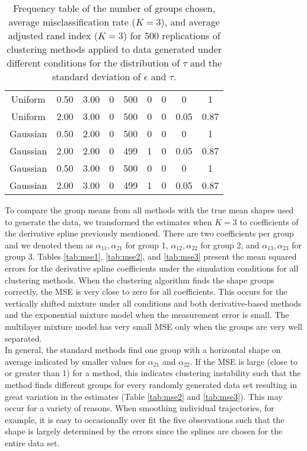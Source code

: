 \begin{table}[ht]
\begin{center}
\begin{tabular}{ccc|cccccc}
  Uniform & 0.50 & 3.00 & 0 & 500 & 0 & 0 & 0 & 1 \\ 
  Uniform & 2.00 & 3.00 & 0 & 500 & 0 & 0 & 0.05 & 0.87 \\ 
  Gaussian & 0.50 & 2.00 & 0 & 500 & 0 & 0 & 0 & 1 \\ 
  Gaussian & 2.00 & 2.00 & 0 & 499 & 1 & 0 & 0.05 & 0.87 \\ 
  Gaussian & 0.50 & 3.00 & 0 & 500 & 0 & 0 & 0 & 1 \\ 
  Gaussian & 2.00 & 3.00 & 0 & 499 & 1 & 0 & 0.05 & 0.87 \\ 
   \hline\end{tabular}
\caption{Frequency table of the number of groups chosen, average misclassification rate ($K=3$), and average adjusted rand index ($K=3$) for 500 replications of clustering methods applied to data generated under different conditions for the distribution of $\tau$ and the standard deviation of $\epsilon$ and $\tau$.}
\label{tab:freq3}
\end{center}
\end{table}

To compare the group means from all methods with the true mean shapes used to generate the data, we transformed the estimates when $K=3$ to coefficients of the derivative spline previously mentioned. There are two coefficients per group and we denoted them as $\alpha_{11},\alpha_{21}$ for group 1, $\alpha_{12},\alpha_{22}$ for group 2, and $\alpha_{13},\alpha_{23}$ for group 3. Tables \ref{tab:mse1}, \ref{tab:mse2}, and \ref{tab:mse3} present the mean squared errors for the derivative spline coefficients under the simulation conditions for all clustering methods. When the clustering algorithm finds the shape groups correctly, the MSE is very close to zero for all coefficients. This occurs for the vertically shifted mixture under all conditions and both derivative-based methods and the exponential mixture model when the measurement error is small. The multilayer mixture model has very small MSE only when the groups are very well separated.\\

 In general, the standard methods find one group with a horizontal shape on average indicated by smaller values for $\alpha_{21}$ and $\alpha_{22}$. If the MSE is large (close to or greater than 1) for a method, this indicates clustering instability such that the method finds different groups for every randomly generated data set resulting in great variation in the estimates (Table \ref{tab:mse2} and \ref{tab:mse3}). This may occur for a variety of reasons. When smoothing individual trajectories, for example, it is easy to occasionally over fit the five observations such that the shape is largely determined by the errors since the splines are chosen for the entire data set.\\
 
